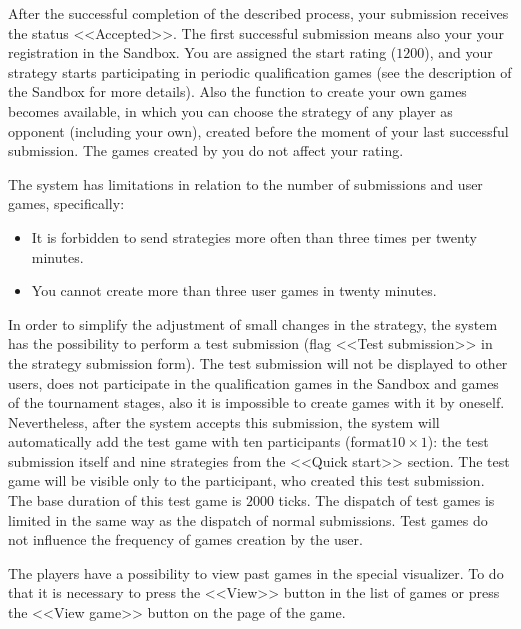 After the successful completion of the described process, your submission receives the status <<Accepted>>. The first successful submission means also your
your registration in the Sandbox. You are assigned the start rating ($1200$), and your strategy starts participating in periodic
qualification games (see the description of the Sandbox for more details). Also the function to create
your own games becomes available, in which you can choose the strategy of any player as opponent (including your own), created before
the moment of your last successful submission. The games created by you do not affect your rating.

The system has limitations in relation to the number of submissions and user games, specifically:
\vspace{-0.15in}
\begin{itemize}
 \item It is forbidden to send strategies more often than three times per twenty minutes.
\vspace{-0.10in}
 \item You cannot create more than three user games in twenty minutes.
\vspace{-0.10in}
\end{itemize}

In order to simplify the adjustment of small changes in the strategy, the system has the possibility to perform a test submission (flag <<Test submission>>
in the strategy submission form). The test submission will not be displayed to other users, does not participate in the qualification games in the Sandbox and
games of the tournament stages, also it is impossible to create games with it by oneself. Nevertheless, after the system accepts this submission, the system
will automatically add the test game with ten participants (format$10\times1$): the test submission itself and nine strategies from
the <<Quick start>> section. The test game will be visible only to the participant, who created this test submission. The base duration of this test
game is $2000$ ticks. The dispatch of test games is limited in the same way as the dispatch of normal submissions. Test games do not influence
the frequency of games creation by the user.
 
The players have a possibility to view past games in the special visualizer. To do that it is necessary to press the <<View>> button in the list of games
or press the <<View game>> button on the page of the game.
 
